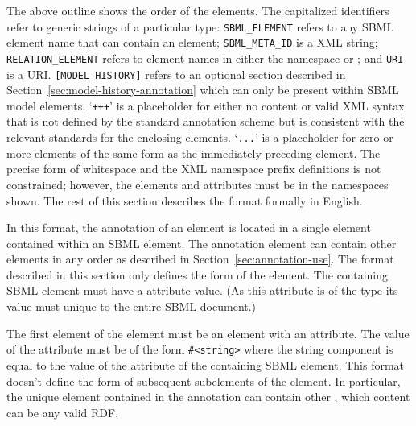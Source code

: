 The above outline shows the order of the elements. The capitalized
identifiers refer to generic strings of a particular type:
\texttt{SBML\_ELEMENT} refers to any SBML element name that can
contain an  element; \texttt{SBML\_META\_ID} is
a XML  string; \texttt{RELATION\_ELEMENT} refers to
element names in either the namespace
 or
; and \texttt{URI} is
a URI.  \texttt{[MODEL\_HISTORY]} refers to an optional section
described in Section~\ref{sec:model-history-annotation} which can
only be present within SBML model elements.
`\texttt{+++}' is a
placeholder for either no content or valid XML syntax that is not
defined by the standard annotation scheme but is consistent with
the relevant standards for the enclosing elements. `\texttt{...}'
is a placeholder for zero or more elements of the same form as the
immediately preceding element.  The precise form of whitespace and
the XML namespace prefix definitions is not constrained; however,
the elements and attributes must be in the namespaces shown. The
rest of this section describes the format formally in English.

In this format, the annotation of an element is located in a single
 element contained within an SBML
 element. The annotation element can contain
other elements in any order as described in 
Section~\ref{sec:annotation-use}.  The format described in this
section only defines the form of the  element. The
containing SBML \SBase element must have a  attribute
value. (As this attribute is of the type  its value
must unique to the entire SBML document.)

The first element of the  element must be an
 element with an 
attribute. The value of the
 attribute must be of the form
\texttt{\#<string>} where the string component is equal to the
value of the  attribute of the containing SBML element.
This format doesn't define the form of subsequent
subelements of the  element. In particular, the unique  element contained in the annotation can contain other , which content can be any valid RDF.

